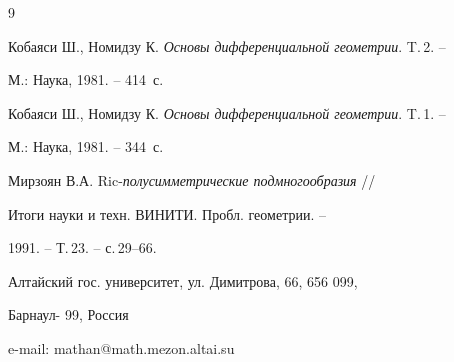 \begin{thebibliography}{9} 


 




Кобаяси Ш., Номидзу К. {\em Основы дифференциальной геометрии}. T.\,2. --


М.: Наука, 1981. -- 414~с.




Кобаяси Ш., Номидзу К. {\em Основы дифференциальной геометрии}. T.\,1. --


М.: Наука, 1981. -- 344~с.




Мирзоян В.А. Ric-{\em полусимметрические подмногообразия} //


Итоги науки и техн. ВИНИТИ. Пробл. геометрии. --


1991. -- Т.\,23. -- с.\,29--66.





\end{thebibliography} 


 


\vskip 2cm 


 








\label{end}


 














Алтайский гос. университет, ул. Димитрова, 66, 656 099, 


Барнаул- 99, Россия 





e-mail: mathan@math.mezon.altai.su


